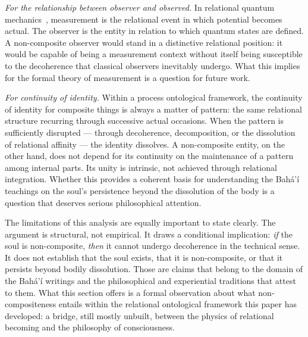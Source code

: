 \emph{For the relationship between observer and observed.}
In relational quantum mechanics~\citep{Rovelli1996}, measurement is the
relational event in which potential becomes actual.
The observer is the entity in relation to which quantum states are defined.
A non-composite observer would stand in a distinctive relational position:
it would be capable of being a measurement context without itself being
susceptible to the decoherence that classical observers inevitably undergo.
What this implies for the formal theory of measurement is a question for
future work.

\emph{For continuity of identity.}
Within a process ontological framework, the continuity of identity for
composite things is always a matter of pattern: the same relational
structure recurring through successive actual occasions.
When the pattern is sufficiently disrupted --- through decoherence, decomposition,
or the dissolution of relational affinity --- the identity dissolves.
A non-composite entity, on the other hand, does not depend for its continuity
on the maintenance of a pattern among internal parts.
Its unity is intrinsic, not achieved through relational integration.
Whether this provides a coherent basis for understanding the Bahá'í teachings
on the soul's persistence beyond the dissolution of the body is a question
that deserves serious philosophical attention.

The limitations of this analysis are equally important to state clearly.
The argument is structural, not empirical.
It draws a conditional implication: \emph{if} the soul is non-composite,
\emph{then} it cannot undergo decoherence in the technical sense.
It does not establish that the soul exists, that it is non-composite,
or that it persists beyond bodily dissolution.
Those are claims that belong to the domain of the Bahá'í writings and the
philosophical and experiential traditions that attest to them.
What this section offers is a formal observation about what non-compositeness
entails within the relational ontological framework this paper has developed:
a bridge, still mostly unbuilt, between the physics of relational becoming
and the philosophy of consciousness.
